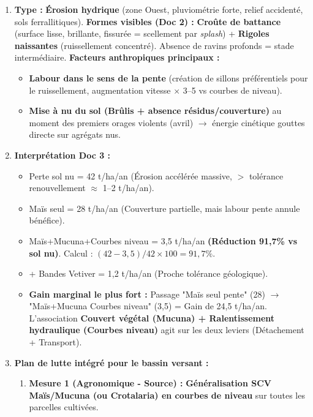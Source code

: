 \documentclass[11pt]{article}
\begin{document}
\begin{corrige}
\begin{enumerate}
    \item \textbf{Type :} \textbf{Érosion hydrique} (zone Ouest, pluviométrie forte, relief accidenté, sols ferrallitiques).
    \textbf{Formes visibles (Doc 2) :} \textbf{Croûte de battance} (surface lisse, brillante, fissurée = scellement par \emph{splash}) + \textbf{Rigoles naissantes} (ruissellement concentré). Absence de ravins profonds = stade intermédiaire.
    \textbf{Facteurs anthropiques principaux :}
    \begin{itemize}
        \item \textbf{Labour dans le sens de la pente} (création de sillons préférentiels pour le ruissellement, augmentation vitesse $\times$ 3--5 vs courbes de niveau).
        \item \textbf{Mise à nu du sol (Brûlis + absence résidus/couverture)} au moment des premiers orages violents (avril) $\rightarrow$ énergie cinétique gouttes directe sur agrégats nus.
    \end{itemize}
    \item \textbf{Interprétation Doc 3 :}
    \begin{itemize}
        \item Perte sol nu = 42 t/ha/an (Érosion accélérée massive, $>$ tolérance renouvellement $\approx$ 1--2 t/ha/an).
        \item Maïs seul = 28 t/ha/an (Couverture partielle, mais labour pente annule bénéfice).
        \item Maïs+Mucuna+Courbes niveau = 3,5 t/ha/an \textbf{(Réduction 91,7\% vs sol nu)}. Calcul : $(42-3,5)/42 \times 100 = 91,7\%$.
        \item + Bandes Vetiver = 1,2 t/ha/an (Proche tolérance géologique).
        \item \textbf{Gain marginal le plus fort :} Passage "Maïs seul pente" (28) $\rightarrow$ "Maïs+Mucuna Courbes niveau" (3,5) = Gain de 24,5 t/ha/an. L'association \textbf{Couvert végétal (Mucuna) + Ralentissement hydraulique (Courbes niveau)} agit sur les deux leviers (Détachement + Transport).
    \end{itemize}
    \item \textbf{Plan de lutte intégré pour le bassin versant :}
    \begin{enumerate}
        \item \textbf{Mesure 1 (Agronomique - Source) :} \textbf{Généralisation SCV Maïs/Mucuna (ou Crotalaria) en courbes de niveau} sur toutes les parcelles cultivées.

\end{enumerate}
\end{enumerate}
\end{corrige}
\end{document}
